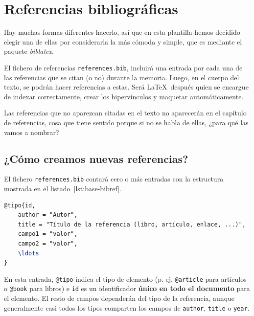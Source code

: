 \documentclass[%
    school=etsisi,%
    degree=61TI,%
]{upm-report}
\begin{document}
\section{Referencias bibliográficas}
\label{s:referencias-bibliograficas}

Hay muchas formas diferentes hacerlo, así que en esta plantilla hemos
decidido elegir una de ellas por considerarla la más cómoda y simple,
que es mediante el paquete \textit{biblatex}.

El fichero de referencias \texttt{references.bib}, incluirá una entrada
por cada una de las referencias que se citan (o no) durante la memoria.
Luego, en el cuerpo del texto, se podrán hacer referencias a estas. Será
\LaTeX~después quien se encargue de indexar correctamente, crear los
hipervínculos y maquetar automáticamente.

Las referencias que no aparezcan citadas en el texto no aparecerán en el
capítulo de referencias, cosa que tiene sentido porque si no se habla de
ellas, ¿para qué las vamos a nombrar?


\subsection{¿Cómo creamos nuevas referencias?}

El fichero \texttt{references.bib} contará cero o más entradas con la estructura mostrada en el listado~\ref{lst:base-bibref}.

\begin{lstlisting}[language=tex,caption=Estructura general de una referencia,label=lst:base-bibref]
@tipo{id,
    author = "Autor",
    title = "Título de la referencia (libro, artículo, enlace, ...)",
    campo1 = "valor",
    campo2 = "valor",
    \ldots
}
\end{lstlisting}

En esta entrada, \texttt{@tipo} indica el tipo de elemento (p. ej.
\texttt{@article} para artículos o \texttt{@book} para libros) e
\texttt{id} es un identificador \textbf{único en todo el documento} para
el elemento. El resto de campos dependerán del tipo de la referencia,
aunque generalmente casi todos los tipos comparten los campos de
\texttt{author}, \texttt{title} o \texttt{year}.
\end{document}
